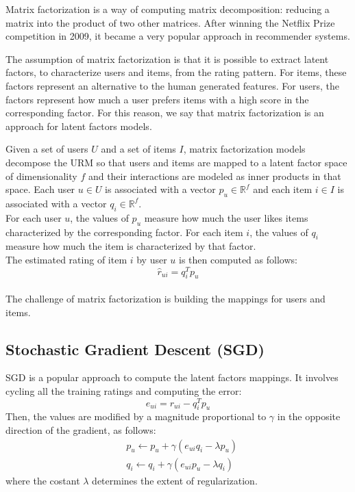 Matrix factorization \cite{10.1109/MC.2009.263} is a way of computing matrix decomposition: reducing a matrix into the product of two other matrices. After winning the Netflix Prize competition in 2009, it became a very popular approach in recommender systems.\par
The assumption of matrix factorization is that it is possible to extract latent factors, to characterize users and items, from the rating pattern. For items, these factors represent an alternative to the human generated features. For users, the factors represent how much a user prefers items with a high score in the corresponding factor. For this reason, we say that matrix factorization is an approach for latent factors models.\par
Given a set of users $U$ and a set of items $I$, matrix factorization models decompose the URM so that users and items are mapped to a latent factor space of dimensionality $f$ and their interactions are modeled as inner products in that space. Each user $u \in U$ is associated with a vector $p_u \in \mathbb{R}^f$ and each item $i \in I$ is associated with a vector $q_i \in \mathbb{R}^f$.\\
For each user $u$, the values of $p_u$ measure how much the user likes items characterized by the corresponding factor. For each item $i$, the values of $q_i$ measure how much the item is characterized by that factor.\\
The estimated rating of item $i$ by user $u$ is then computed as follows:
\[ \hat{r}_{ui} = q_i^T p_u \]\\
The challenge of matrix factorization is building the mappings for users and items.


\subsection{Stochastic Gradient Descent (SGD)}

SGD is a popular approach \cite{ImprovingSVD, 10.1145/1401890.1401944, 10.1145/1345448.1345466} to compute the latent factors mappings. It involves cycling all the training ratings and computing the error:
\[ e_{ui} = r_{ui} - q_i^T p_u \]
Then, the values are modified by a magnitude proportional to $\gamma$ in the opposite direction of the gradient, as follows:
\begin{equation*}
\begin{split}
& p_u \gets p_u + \gamma (e_{ui} q_i - \lambda p_u) \\
& q_i \gets q_i + \gamma (e_{ui} p_u - \lambda q_i)
\end{split}
\end{equation*}
where the costant $\lambda$ determines the extent of regularization.



